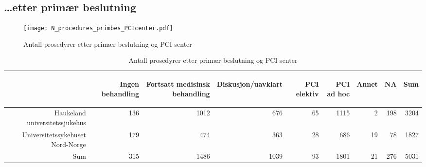 \documentclass[norsk, a4paper]{report}
\begin{document}
\clearpage
\subsection{\ldots etter primær beslutning}


\begin{figure}[ht]
  \centering
\texttt{[image: N\_procedures\_primbes\_PCIcenter.pdf]}  \caption{Antall prosedyrer etter primær beslutning og PCI senter}
\end{figure}

\begin{tiny}
\begin{table}[ht]
\centering
\begin{tabular}{rrrrrrrrr}
  \toprule
 & \begin{sideways} Ingen behandling \end{sideways} & \begin{sideways} Fortsatt medisinsk behandling \end{sideways} & \begin{sideways} Diskusjon/uavklart \end{sideways} & \begin{sideways} PCI elektiv \end{sideways} & \begin{sideways} PCI ad hoc \end{sideways} & \begin{sideways} Annet \end{sideways} & \begin{sideways} NA \end{sideways} & \begin{sideways} Sum \end{sideways} \\ 
  \midrule
Haukeland universitetssjukehus & 136 & 1012 & 676 & 65 & 1115 & 2 & 198 & 3204 \\ 
  Universitetssykehuset Nord-Norge & 179 & 474 & 363 & 28 & 686 & 19 & 78 & 1827 \\ 
  Sum & 315 & 1486 & 1039 & 93 & 1801 & 21 & 276 & 5031 \\ 
   \bottomrule
\end{tabular}
\caption{Antall prosedyrer etter primær beslutning og PCI senter} 
\end{table}\end{tiny}
\end{document}
